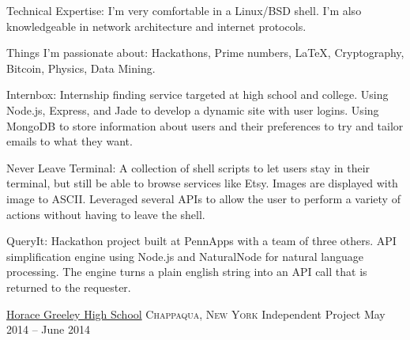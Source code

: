 \documentclass[11pt]{article}
\begin{document}
\inlineheadsection
  {Technical Expertise:}
  {I'm very comfortable in a Linux/BSD shell.  I'm also knowledgeable in network architecture and internet protocols.}

\inlineheadsection
  {Things I'm passionate about:}
  {Hackathons, Prime numbers, \LaTeX, Cryptography, Bitcoin, Physics, Data Mining.}


\spacedhrule{0.1em}{0.9em}  %

\inlineheadsection  %
  {Internbox:}
  { Internship finding service targeted at high school and college.  Using Node.js, Express, and Jade to develop a dynamic site with user logins.  Using MongoDB to store information about users and their preferences to try and tailor emails to what they want. }

\inlineheadsection
	{Never Leave Terminal:}
	{ A collection of shell scripts to let users stay in their terminal, but still be able to browse services like Etsy.  Images are displayed with image to ASCII.  Leveraged several APIs to allow the user to perform a variety of actions without having to leave the shell. }

\inlineheadsection
  {QueryIt:}
  { Hackathon project built at PennApps with a team of three others.  API simplification engine using Node.js and NaturalNode for natural language processing.  The engine turns a plain english string into an API call that is returned to the requester. }

\vspace{0.5em}


\spacedhrule{0.1em}{0.9em}  %


\headedsection  %
  {\href{http://hg.ccsd.ws/}{Horace Greeley High School}}
  {\textsc{Chappaqua, New York}} {
  \headedsubsection
    {Independent Project}
    {May 2014 -- June 2014}
    {}
}
\end{document}
